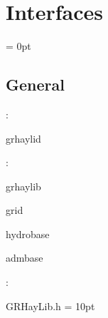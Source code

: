 
\section{Interfaces} 


\parskip = 0pt

\vspace{3mm} \subsection*{General}

: 

grhaylid
\vspace{2mm}

: 

grhaylib

grid

hydrobase

admbase
\vspace{2mm}

\vspace{5mm}

: 

GRHayLib.h
\vspace{2mm}\parskip = 10pt 
